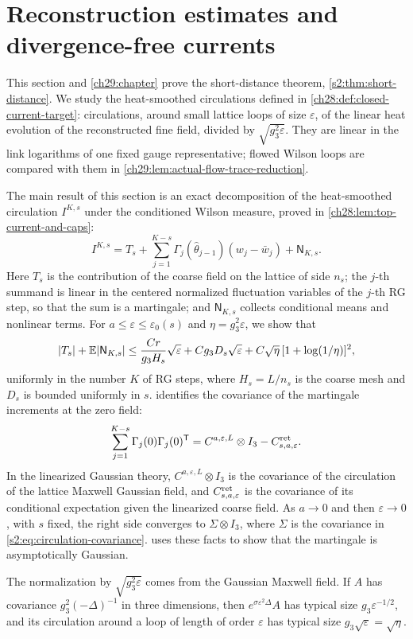 \chapter{Reconstruction estimates and divergence-free currents}\label{ch28:chapter}

This section and \cref{ch29:chapter} prove the short-distance theorem, \cref{s2:thm:short-distance}. We study the heat-smoothed circulations defined in \cref{ch28:def:closed-current-target}: circulations, around small lattice loops of size $\varepsilon$, of the linear heat evolution of the reconstructed fine field, divided by $\sqrt{g_3^2\varepsilon}$. They are linear in the link logarithms of one fixed gauge representative; flowed Wilson loops are compared with them in \cref{ch29:lem:actual-flow-trace-reduction}.

The main result of this section is an exact decomposition of the heat-smoothed circulation $I^{K,s}$ under the conditioned Wilson measure, proved in \cref{ch28:lem:top-current-and-caps}:
\[
 I^{K,s}=T_s+\sum_{j=1}^{K-s}\Gamma_j(\widehat\theta_{j-1})(w_j-\bar w_j)+\mathsf N_{K,s}.
\]
Here $T_s$ is the contribution of the coarse field on the lattice of side $n_s$; the $j$-th summand is linear in the centered normalized fluctuation variables of the $j$-th RG step, so that the sum is a martingale; and $\mathsf N_{K,s}$ collects conditional means and nonlinear terms. For $a\le\varepsilon\le\varepsilon_0(s)$ and $\eta=g_3^2\varepsilon$, we show that
\[
 |T_s|+\mathbb E|\mathsf N_{K,s}|\le\frac{Cr}{g_3H_s}\sqrt\varepsilon+Cg_3D_s\sqrt\varepsilon+C\sqrt\eta\,[1+\log(1/\eta)]^2,
\]
uniformly in the number $K$ of RG steps, where $H_s=L/n_s$ is the coarse mesh and $D_s$ is bounded uniformly in $s$.  identifies the covariance of the martingale increments at the zero field:
\[
 \sum_{j=1}^{K-s}\Gamma_j(0)\Gamma_j(0)^{\mathsf T}=C^{a,\varepsilon,L}\otimes I_3-C^{\rm ret}_{s,a,\varepsilon}.
\]
In the linearized Gaussian theory, $C^{a,\varepsilon,L}\otimes I_3$ is the covariance of the circulation of the lattice Maxwell Gaussian field, and $C^{\rm ret}_{s,a,\varepsilon}$ is the covariance of its conditional expectation given the linearized coarse field. As $a\to0$ and then $\varepsilon\to0$, with $s$ fixed, the right side converges to $\Sigma\otimes I_3$, where $\Sigma$ is the covariance in \eqref{s2:eq:circulation-covariance}.  uses these facts to show that the martingale is asymptotically Gaussian.

The normalization by $\sqrt{g_3^2\varepsilon}$ comes from the Gaussian Maxwell field. If $A$ has covariance $g_3^2(-\Delta)^{-1}$ in three dimensions, then $e^{\sigma\varepsilon^2\Delta}A$ has typical size $g_3\varepsilon^{-1/2}$, and its circulation around a loop of length of order $\varepsilon$ has typical size $g_3\sqrt\varepsilon=\sqrt\eta$.

